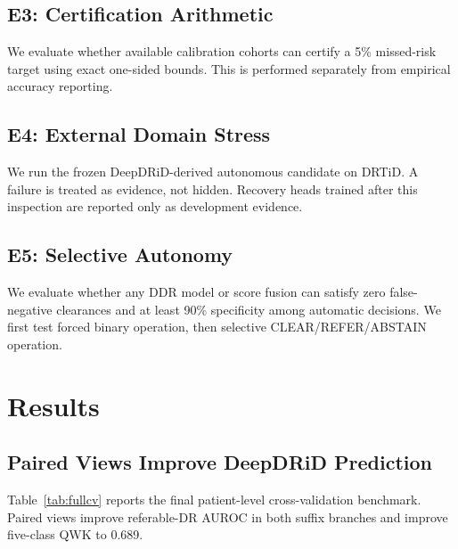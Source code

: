 \documentclass[journal]{IEEEtran}
\begin{document}
\subsection{E3: Certification Arithmetic}
We evaluate whether available calibration cohorts can certify a 5\% missed-risk target using exact one-sided bounds. This is performed separately from empirical accuracy reporting.

\subsection{E4: External Domain Stress}
We run the frozen DeepDRiD-derived autonomous candidate on DRTiD. A failure is treated as evidence, not hidden. Recovery heads trained after this inspection are reported only as development evidence.

\subsection{E5: Selective Autonomy}
We evaluate whether any DDR model or score fusion can satisfy zero false-negative clearances and at least 90\% specificity among automatic decisions. We first test forced binary operation, then selective CLEAR/REFER/ABSTAIN operation.

\section{Results}
\subsection{Paired Views Improve DeepDRiD Prediction}
Table~\ref{tab:fullcv} reports the final patient-level cross-validation benchmark. Paired views improve referable-DR AUROC in both suffix branches and improve five-class QWK to 0.689.
\end{document}
